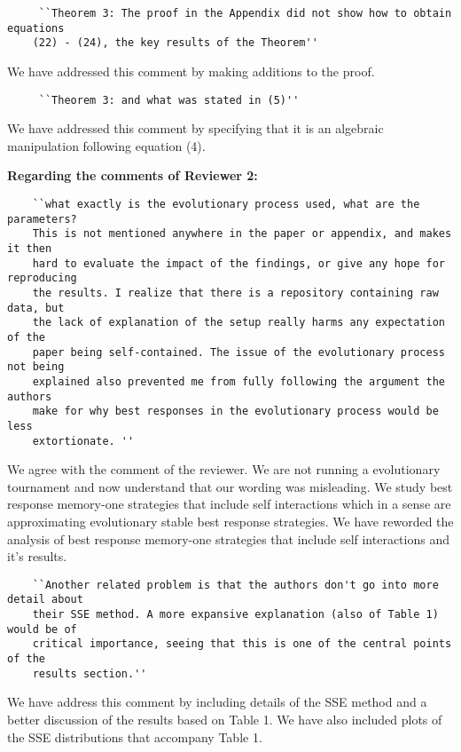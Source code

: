 \documentclass{article}
\begin{document}
\begin{verbatim}
     ``Theorem 3: The proof in the Appendix did not show how to obtain equations
    (22) - (24), the key results of the Theorem''
\end{verbatim}

We have addressed this comment by making additions to the proof.

\begin{verbatim}
     ``Theorem 3: and what was stated in (5)''
\end{verbatim}

We have addressed this comment by specifying that it is an algebraic manipulation
following equation (4).

\textbf{Regarding the comments of Reviewer 2:}

\begin{verbatim}
    ``what exactly is the evolutionary process used, what are the parameters?
    This is not mentioned anywhere in the paper or appendix, and makes it then
    hard to evaluate the impact of the findings, or give any hope for reproducing
    the results. I realize that there is a repository containing raw data, but
    the lack of explanation of the setup really harms any expectation of the
    paper being self-contained. The issue of the evolutionary process not being
    explained also prevented me from fully following the argument the authors
    make for why best responses in the evolutionary process would be less
    extortionate. ''
\end{verbatim}

We agree with the comment of the reviewer. We are not running a evolutionary
tournament and now understand that our wording was misleading. We study best
response memory-one strategies that include self interactions which in a sense are
approximating evolutionary stable best response strategies. We have reworded
the analysis of best response memory-one strategies that include self interactions
and it's results.

\begin{verbatim}
    ``Another related problem is that the authors don't go into more detail about
    their SSE method. A more expansive explanation (also of Table 1) would be of
    critical importance, seeing that this is one of the central points of the
    results section.''
\end{verbatim}

We have address this comment by including details of the SSE method and a better
discussion of the results based on Table 1. We have also included plots of the
SSE distributions that accompany Table 1.
\end{document}

